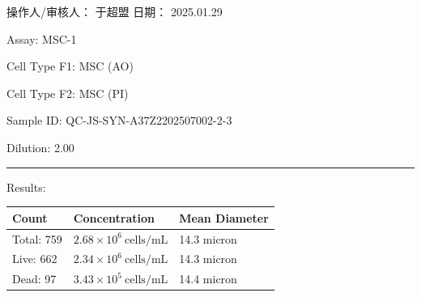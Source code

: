 \documentclass[UTF8,10pt,a4paper,fontset=fandol]{ctexart}
\newcommand{\fieldvalue}[1]{#1}
\newcommand{\handwritten}[1]{#1}
\begin{document}
\begin{center}
\begin{center}
\vfill

\noindent
操作人/审核人：%
\fieldvalue{\handwritten{于超盟}}
\hfill
日期：%
\fieldvalue{\handwritten{2025.01.29}}

\newpage

\noindent
Assay:
\fieldvalue{MSC-1}

\noindent
Cell Type F1:
\fieldvalue{MSC (AO)}

\noindent
Cell Type F2:
\fieldvalue{MSC (PI)}

\noindent
Sample ID:
\fieldvalue{QC-JS-SYN-A37Z2202507002-2-3}

\noindent
Dilution:
\fieldvalue{2.00}

\medskip
\noindent\hrule
\medskip

\noindent Results:

\begin{tabularx}{\textwidth}{@{}lll@{}}
\textbf{Count} & \textbf{Concentration} & \textbf{Mean Diameter} \\
\hline
Total:
\fieldvalue{759}
&
\fieldvalue{$2.68\times 10^{6}\ \mathrm{cells/mL}$}
&
\fieldvalue{14.3 micron}
\\
Live:
\fieldvalue{662}
&
\fieldvalue{$2.34\times 10^{6}\ \mathrm{cells/mL}$}
&
\fieldvalue{14.3 micron}
\\
Dead:
\fieldvalue{97}
&
\fieldvalue{$3.43\times 10^{5}\ \mathrm{cells/mL}$}
&
\fieldvalue{14.4 micron}
\end{tabularx}


\end{center}
\end{center}
\end{document}
